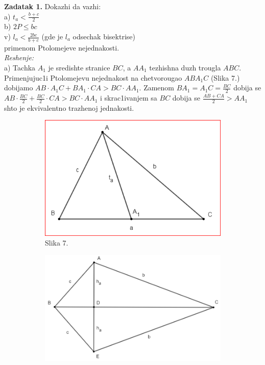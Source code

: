 \documentclass[11pt]{article}
\newcommand{\D}{\displaystyle}
\begin{document}
\begin{flushleft}
\large
\textbf{Zadatak 1.} Dokazhi da vazhi: \\
a) $\D t_a<\frac{b+c}{2}$ \\
b) $\D 2P\leq bc$ \\
v) $\D l_a<\frac{2bc}{b+c}$ (gde je $l_a$ odsechak bisektrise)\\
primenom Ptolomejeve nejednakosti.\\
\vspace{0.05cm}
\textit{Reshenje:}\\
\vspace{0.05cm}
a) Tachka $A_1$ je sredishte stranice $BC$, a $AA_1$ tezhishna duzh trougla $ABC$. Primenjujuc1i Ptolomejevu nejednakost na chetvorougao $ABA_1C$ (Slika 7.) dobijamo
$AB\cdot A_1C+BA_1\cdot CA>BC\cdot AA_1$. Zamenom $\D BA_1=A_1C=\frac{BC}{2}$ dobija se $\D AB\cdot \frac{BC}{2}+\frac{BC}{2}\cdot CA>BC\cdot AA_1$ i skrac1ivanjem sa $BC$ dobija se $\D \frac{AB+CA}{2}>AA_1$ shto je ekvivalentno trazhenoj jednakosti.\\
\vspace{0.2cm}
\begin{figure}[h!]
\begin{subfigure}{0.4\textwidth}
\includegraphics[width=\linewidth]{Slike/Slika8}
\caption*{Slika 7.} 
\end{subfigure}
\hspace*{\fill}
\begin{subfigure}{0.48\textwidth}
\includegraphics[width=\linewidth]{Slike/Slika91}

\end{subfigure}
\end{figure}
\end{flushleft}
\end{document}
